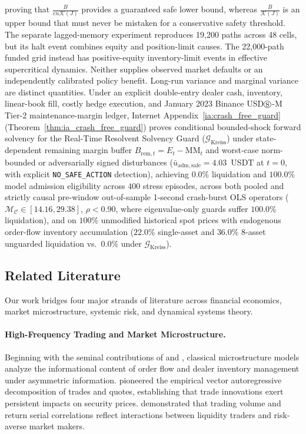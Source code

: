 \documentclass[12pt]{article}
\theoremstyle{definition}
\theoremstyle{remark}
\begin{document}
proving that $\frac{B}{e n \mathcal{K}(J)}$ provides a guaranteed safe lower bound, whereas $\frac{B}{\mathcal{K}(J)}$ is an upper bound that must never be mistaken for a conservative safety threshold. The separate lagged-memory experiment reproduces 19,200 paths across 48 cells, but its halt event combines equity and position-limit causes. The 22,000-path funded grid instead has positive-equity inventory-limit events in effective supercritical dynamics. Neither supplies observed market defaults or an independently calibrated policy benefit. Long-run variance and marginal variance are distinct quantities. Under an explicit double-entry dealer cash, inventory, linear-book fill, costly hedge execution, and January 2023 Binance USD$\circledS$-M Tier-2 maintenance-margin ledger, Internet Appendix~\ref{ia:crash_free_guard} (Theorem~\ref{thm:ia_crash_free_guard}) proves conditional bounded-shock forward solvency for the Real-Time Resolvent Solvency Guard ($\mathcal{G}_{\mathrm{Kreiss}}$) under state-dependent remaining margin buffer $B_{\mathrm{rem},t} = E_t - \mathrm{MM}_t$ and worst-case norm-bounded or adversarially signed disturbances ($\bar{u}_{\mathrm{adm,safe}} = 4.03$~USDT at $t=0$, with explicit \texttt{NO\_SAFE\_ACTION} detection), achieving $0.0\%$ liquidation and $100.0\%$ model admission eligibility across $400$ stress episodes, across both pooled and strictly causal pre-window out-of-sample 1-second crash-burst OLS operators ($\mathcal{M}_{\mathcal{C}} \in [14.16, 29.38]$, $\rho < 0.90$, where eigenvalue-only guards suffer $100.0\%$ liquidation), and on $100\%$ unmodified historical spot prices with endogenous order-flow inventory accumulation ($22.0\%$ single-asset and $36.0\%$ 8-asset unguarded liquidation vs.\ $0.0\%$ under $\mathcal{G}_{\mathrm{Kreiss}}$).

\subsection{Related Literature}
Our work bridges four major strands of literature across financial economics, market microstructure, systemic risk, and dynamical systems theory.

\paragraph{High-Frequency Trading and Market Microstructure.}
Beginning with the seminal contributions of \citet{kyle1985continuous} and \citet{glosten1985bid}, classical microstructure models analyze the informational content of order flow and dealer inventory management under asymmetric information. \citet{hasbrouck1991} pioneered the empirical vector autoregressive decomposition of trades and quotes, establishing that trade innovations exert persistent impacts on security prices. \citet{campbell1993trading} demonstrated that trading volume and return serial correlations reflect interactions between liquidity traders and risk-averse market makers.
\end{document}
